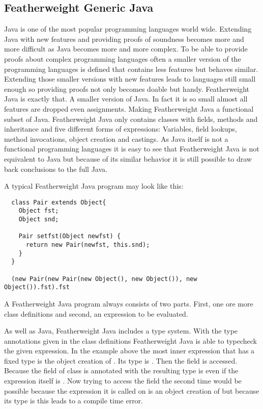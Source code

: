 \subsection{Featherweight Generic Java}
Java is one of the most popular programming languages world wide. Extending Java with new features and providing proofs of soundness becomes more and more difficult as Java becomes more and more complex.
To be able to provide proofs about complex programming languages often a smaller version of the programming languages is defined that contains less features but behaves similar.
Extending those smaller versions with new features leads to languages still small enough so providing proofs not only becomes doable but handy.
Featherweight Java is exactly that. A smaller version of Java. In fact it is so small almost all features are dropped even assignments. Making Featherweight Java a functional subset of Java.
Featherweight Java only contains classes with fields, methods and inheritance and five different forms of expressions: Variables, field lookups, method invocations, object creation and castings.
As Java itself is not a functional programming languages it is easy to see that Featherweight Java is not equivalent to Java but because of its similar behavior it is still possible to draw back conclusions to the full Java.

A typical Featherweight Java program may look like this:

\begin{verbatim}
  class Pair extends Object{
    Object fst;
    Object snd;

    Pair setfst(Object newfst) {
      return new Pair(newfst, this.snd);
    }
  }

  (new Pair(new Pair(new Object(), new Object()), new Object()).fst).fst
\end{verbatim}

A Featherweight Java program always consists of two parts. First, one ore more class definitions and second, an expression to be evaluated.

As well as Java, Featherweight Java includes a type system. With the type annotations given in the class definitions Featherweight Java is able to typecheck the given expression.
In the example above the most inner expression that has a fixed type is the object creation of . Its type is .
Then the field  is accessed. Because the field  of class  is annotated with  the resulting type is  even if the expression itself is .
Now trying to access the field  the second time would be possible because the expression it is called on is an object creation of  but because its type is  this leads to a compile time error.

